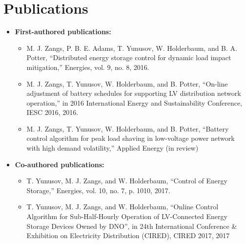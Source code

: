 \section{Publications}
\label{ch-introduction:sec:publications}


\begin{itemize}

\item \textbf{First-authored publications:}
\begin{itemize}
	\item M. J. Zangs, P. B. E. Adams, T. Yunusov, W. Holderbaum, and B. A. Potter, ``Distributed energy storage control for dynamic load impact mitigation,'' Energies, vol. 9, no. 8, 2016.
	\item M. J. Zangs, T. Yunusov, W. Holderbaum, and B. Potter, ``On-line adjustment of battery schedules for supporting LV distribution network operation,'' in 2016 International Energy and Sustainability Conference, IESC 2016, 2016.
	\item M. J. Zangs, T. Yunusov, W. Holderbaum, and B. Potter, ``Battery control algorithm for peak load shaving in low-voltage power network with high demand volatility,'' Applied Energy (in review)
\end{itemize}

\item \textbf{Co-authored publications:}
\begin{itemize}
	\item T. Yunusov, M. J. Zangs, and W. Holderbaum, ``Control of Energy Storage,'' Energies, vol. 10, no. 7, p. 1010, 2017.
	\item T. Yunusov, M. J. Zangs, and W. Holderbaum, ``Online Control Algorithm for Sub-Half-Hourly Operation of LV-Connected Energy Storage Devices Owned by DNO'', in 24th International Conference \& Exhibition on Electricity Distribution (CIRED), CIRED 2017, 2017
\end{itemize}

\end{itemize}




